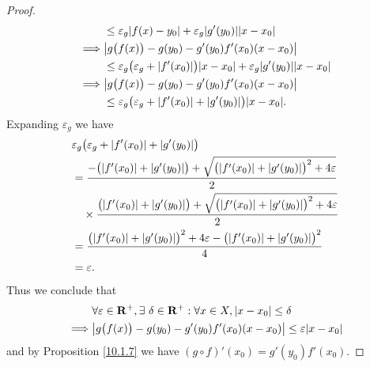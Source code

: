 \begin{proof}
\begin{align*}
                 & \leq \varepsilon_g \abs{f(x) - y_0} + \varepsilon_g \abs{g'(y_0)} \abs{x - x_0}                                      \\
        \implies & \abs{g\big(f(x)\big) - g(y_0) - g'(y_0) f'(x_0) (x - x_0)}                                                           \\
                 & \leq \varepsilon_g \big(\varepsilon_g + \abs{f'(x_0)}\big) \abs{x - x_0} + \varepsilon_g \abs{g'(y_0)} \abs{x - x_0} \\
        \implies & \abs{g\big(f(x)\big) - g(y_0) - g'(y_0) f'(x_0) (x - x_0)}                                                           \\
                 & \leq \varepsilon_g \big(\varepsilon_g + \abs{f'(x_0)} + \abs{g'(y_0)}\big) \abs{x - x_0}.
    \end{align*}
    Expanding \(\varepsilon_g\) we have
    \begin{align*}
         & \varepsilon_g \big(\varepsilon_g + \abs{f'(x_0)} + \abs{g'(y_0)}\big)                                                             \\
         & = \frac{-\big(\abs{f'(x_0)} + \abs{g'(y_0)}\big) + \sqrt{\big(\abs{f'(x_0)} + \abs{g'(y_0)}\big)^2 + 4 \varepsilon}}{2}           \\
         & \quad \times \frac{\big(\abs{f'(x_0)} + \abs{g'(y_0)}\big) + \sqrt{\big(\abs{f'(x_0)} + \abs{g'(y_0)}\big)^2 + 4 \varepsilon}}{2} \\
         & = \frac{\big(\abs{f'(x_0)} + \abs{g'(y_0)}\big)^2 + 4 \varepsilon - \big(\abs{f'(x_0)} + \abs{g'(y_0)}\big)^2}{4}                 \\
         & = \varepsilon.
    \end{align*}
    Thus we conclude that
    \begin{align*}
                 & \forall \varepsilon \in \R^+, \exists\ \delta \in \R^+ : \forall x \in X, \abs{x - x_0} \leq \delta \\
        \implies & \abs{g\big(f(x)\big) - g(y_0) - g'(y_0) f'(x_0) (x - x_0)} \leq \varepsilon \abs{x - x_0}
    \end{align*}
    and by Proposition \ref{10.1.7} we have \((g \circ f)'(x_0) = g'(y_0) f'(x_0)\).
\end{proof}

